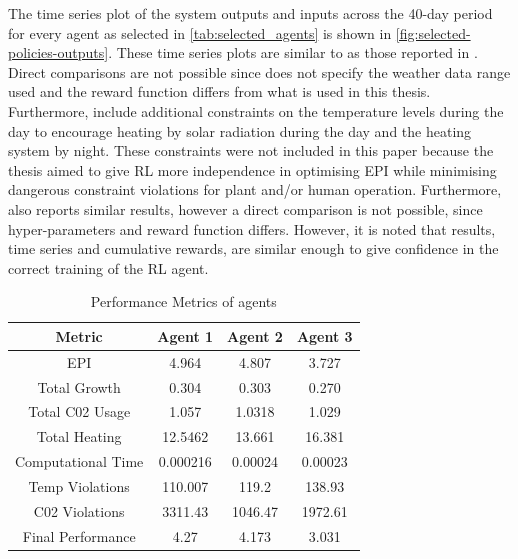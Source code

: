 The time series plot of the system outputs and inputs across the 40-day period for every agent as selected in \autoref{tab:selected_agents} is shown in \autoref{fig:selected-policies-outputs}. These time series plots are similar to as those reported in \cite{jansenOptimalControlLettuce2023,morcegoReinforcementLearningModel2023}. Direct comparisons are not possible since \cite{morcegoReinforcementLearningModel2023} does not specify the weather data range used and the reward function differs from what is used in this thesis. Furthermore, \cite{morcegoReinforcementLearningModel2023} include additional constraints on the temperature levels during the day to encourage heating by solar radiation during the day and the heating system by night. These constraints were not included in this paper because the thesis aimed to give RL more independence in optimising EPI while minimising dangerous constraint violations for plant and/or human operation. Furthermore, \cite{jansenOptimalControlLettuce2023} also reports similar results, however a direct comparison is not possible, since hyper-parameters and reward function differs. However, it is noted that results, time series and cumulative rewards, are similar enough to give confidence in the correct training of the RL agent.
\begin{table}[H]
    \centering
    \begin{tabular}{|c|c|c|c|}
    \hline
         Metric& Agent 1 & Agent 2 & Agent 3  \\
         \hline
         EPI                &4.964      & 4.807     &3.727 \\
         Total Growth       &0.304      &0.303      &0.270 \\
         Total C02 Usage    &1.057      &1.0318     &1.029 \\
         Total Heating      &12.5462    &13.661     &16.381 \\
         Computational Time &0.000216   &0.00024    &0.00023 \\
         Temp Violations    &110.007    &119.2      &138.93 \\
         C02 Violations     &3311.43    &1046.47    &1972.61 \\
          Final Performance &4.27       &4.173      &3.031 \\ 
         \hline
    \end{tabular}
    \caption{Performance Metrics of agents}
    \label{tab:perf-metrics-selected-policies}
\end{table}


